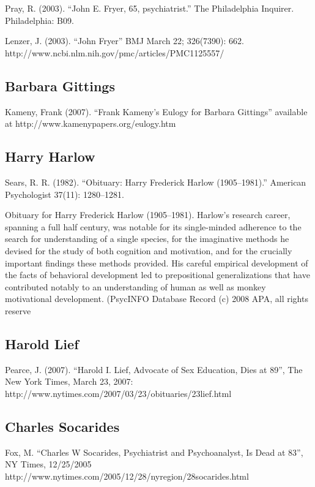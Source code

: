 \begin{refsection}
\begin{appendices}
Pray, R. (2003). “John E. Fryer, 65, psychiatrist.” The Philadelphia Inquirer. Philadelphia: B09.

Lenzer, J. (2003). “John Fryer” BMJ March 22; 326(7390): 662. http:\slash \slash www.ncbi.nlm.nih.gov\slash pmc\slash articles\slash PMC1125557\slash  

\subsection{Barbara Gittings}
\label{barbaragittings}

Kameny, Frank (2007). “Frank Kameny's Eulogy for Barbara Gittings” available at http:\slash \slash www.kamenypapers.org\slash eulogy.htm

\subsection{Harry Harlow}
\label{harryharlow}

Sears, R. R. (1982). ``Obituary: Harry Frederick Harlow (1905--1981).'' American Psychologist 37(11): 1280--1281. 

Obituary for Harry Frederick Harlow (1905--1981). Harlow's research career, spanning a full half century, was notable for its single-minded adherence to the search for understanding of a single species, for the imaginative methods he devised for the study of both cognition and motivation, and for the crucially important findings these methods provided. His careful empirical development of the facts of behavioral development led to prepositional generalizations that have contributed notably to an understanding of human as well as monkey motivational development. (PsycINFO Database Record (c) 2008 APA, all rights reserve 

\subsection{Harold Lief}
\label{haroldlief}

Pearce, J. (2007). “Harold I. Lief, Advocate of Sex Education, Dies at 89”, The New York Times, March 23, 2007: http:\slash \slash www.nytimes.com\slash 2007\slash 03\slash 23\slash obituaries\slash 23lief.html 

\subsection{Charles Socarides}
\label{charlessocarides}

Fox, M. “Charles W Socarides, Psychiatrist and Psychoanalyst, Is Dead at 83”, NY Times, 12\slash 25\slash 2005 http:\slash \slash www.nytimes.com\slash 2005\slash 12\slash 28\slash nyregion\slash 28socarides.html


\end{appendices}
\end{refsection}
